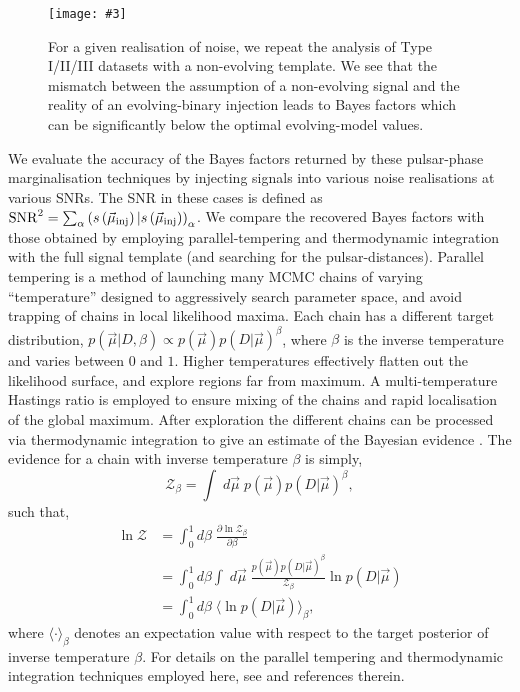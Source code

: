 \documentclass[prd,twocolumn,showpacs,nofootinbib]{revtex4}
\newcommand{\incgraph}[3]{\texttt{[image: \#3]}}
\begin{document}
\begin{figure}
  \centering
\incgraph{0}{0.5}{Evolve_NonEvolve_BayesSNR_15-06-2014.pdf}
\caption{\label{fig:EvNonEv_BayesCompare}For a given realisation of noise, we repeat the analysis of Type I/II/III datasets with a non-evolving template. We see that the mismatch between the assumption of a non-evolving signal and the reality of an evolving-binary injection leads to Bayes factors which can be significantly below the optimal evolving-model values.} 
 \end{figure}

We evaluate the accuracy of the Bayes factors returned by these pulsar-phase marginalisation techniques by injecting signals into various noise realisations at various SNRs. The SNR in these cases is defined as ${\rm SNR}^2 = \sum_{\alpha}\left(s\left(\vec{\mu}_{\rm inj}\right)|s\left(\vec{\mu}_{\rm inj}\right)\right)_{\alpha}$. We compare the recovered Bayes factors with those obtained by employing parallel-tempering and thermodynamic integration with the full signal template (and searching for the pulsar-distances). Parallel tempering is a method of launching many MCMC chains of varying ``temperature'' designed to aggressively search parameter space, and avoid trapping of chains in local likelihood maxima. Each chain has a different target distribution, $p(\vec\mu|D,\beta)\propto p(\vec\mu)p(D|\vec\mu)^{\beta}$, where $\beta$ is the inverse temperature and varies between $0$ and $1$. Higher temperatures effectively flatten out the likelihood surface, and explore regions far from maximum. A multi-temperature Hastings ratio is employed to ensure mixing of the chains and rapid localisation of the global maximum. After exploration the different chains can be processed via thermodynamic integration to give an estimate of the Bayesian evidence \citep[e.g.,][]{littenberg-cornish-2010}. The evidence for a chain with inverse temperature $\beta$ is simply,
\begin{equation}
\mathcal{Z}_{\beta} = \int\;d\vec\mu\; p(\vec\mu)p(D|\vec\mu)^{\beta},
\end{equation}
such that,
\begin{align}
\ln\mathcal{Z} &= \int_0^1d\beta\;\frac{\partial\ln\mathcal{Z}_{\beta}}{\partial\beta} \nonumber\\
&= \int_0^1d\beta\int\;d\vec\mu\; \frac{p(\vec\mu)p(D|\vec\mu)^{\beta}}{\mathcal{Z}_{\beta}}\ln p(D|\vec\mu)\nonumber\\
&= \int_0^1d\beta\;\langle\ln p(D|\vec\mu)\rangle_{\beta},
\end{align}
where $\langle\cdot\rangle_{\beta}$ denotes an expectation value with respect to the target posterior of inverse temperature $\beta$. For details on the parallel tempering and thermodynamic integration techniques employed here, see \citet[]{ellisbayesian2013, nanogravCW_2014} and references therein.
\end{document}
